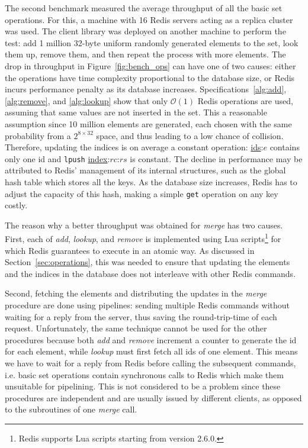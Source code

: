 The second benchmark measured the average throughput of all the basic set
operations. For this, a machine with 16 Redis servers acting as a replica
cluster was used. The client library was deployed on another machine to perform
the test: add 1 million 32-byte uniform randomly generated elements to the set,
look them up, remove them, and then repeat the process with more elements.
The drop in throughput in Figure~\ref{fig:bench_ops} can have one of two causes:
either the operations have time complexity proportional to the database size, or
Redis incurs performance penalty as its database increases.
Specifications~\ref{alg:add}, \ref{alg:remove}, and \ref{alg:lookup} show that
only $\mathcal{O}(1)$ Redis operations are used, assuming that same values are
not inserted in the set. This a reasonable assumption since 10 million elements
are generated, each chosen with the same probability from a $2^{8 \times 32}$
space, and thus leading to a low chance of collision. Therefore, updating the
indices is on average a constant operation: \underline{ids}:$e$ contains only
one id and \texttt{lpush} \underline{index}:$rc$:$rs$ is constant. The decline
in performance may be attributed to Redis' management of its internal
structures, such as the global hash table which stores all the keys. As the
database size increases, Redis has to adjust the capacity of this hash, making a
simple \texttt{get} operation on any key costly.

The reason why a better throughput was obtained for \textit{merge} has two
causes. First, each of \textit{add}, \textit{lookup}, and \textit{remove} is
implemented using Lua scripts\footnote{Redis supports Lua scripts starting from
version 2.6.0.} for which Redis guarantees to execute in an atomic way. As
discussed in Section~\ref{sec:operations}, this was needed to ensure that
updating the elements and the indices in the database does not interleave with
other Redis commands. 

Second, fetching the elements and distributing the updates
in the \textit{merge} procedure are done using pipelines: sending multiple Redis
commands without waiting for a reply from the server, thus saving the
round-trip-time of each request. Unfortunately, the same technique cannot be
used for the other procedures because both \textit{add} and \textit{remove}
increment a counter to generate the id for each element, while \textit{lookup}
must first fetch all ids of one element. This means we have to wait for a reply
from Redis before calling the subsequent commands, i.e. basic set operations
contain synchronous calls to Redis which make them unsuitable for pipelining. 
This is not considered to be a problem since these procedures are independent
and are usually issued by different clients, as opposed to the subroutines of
one \textit{merge} call.